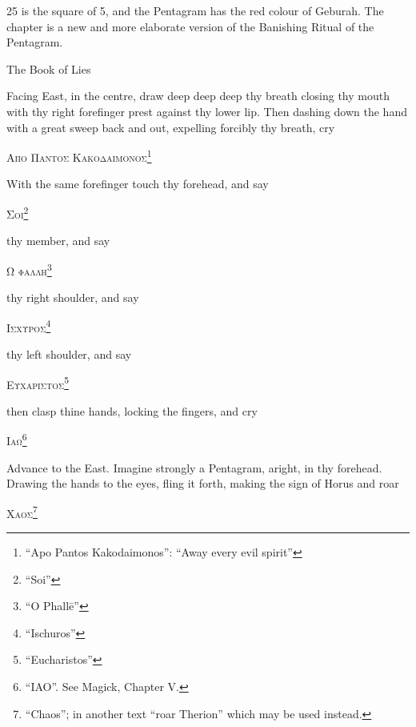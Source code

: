 
\epigraph{25 is the square of 5, and the Pentagram has the red colour of Geburah. The chapter is a new and more elaborate version of the Banishing Ritual of the Pentagram.}{The Book of Lies}


Facing East, in the centre, draw deep deep deep thy breath closing thy mouth with thy right forefinger prest against thy lower lip. Then dashing down the hand with a great sweep back and out, expelling forcibly thy breath, cry


\begin{quoting}[indentfirst=false]
\textsc{Απο Παντοσ Κακοδαιμονοσ}\footnote{\enquote{Apo Pantos Kakodaimonos}: \enquote{Away every evil spirit}}
\end{quoting}

With the same forefinger touch thy forehead, and say
\begin{quoting}[indentfirst=false]
\textsc{Σοι}\footnote{\enquote{Soi}}
\end{quoting}

thy member, and say
\begin{quoting}[indentfirst=false]
\textsc{Ω φαλλη}\footnote{\enquote{O Phall\=e}}
\end{quoting}

thy right shoulder, and say
\begin{quoting}[indentfirst=false]
\textsc{Ισχυροσ}\footnote{\enquote{Ischuros}}
\end{quoting}

thy left shoulder, and say
\begin{quoting}[indentfirst=false]
\textsc{Ευχαριστοσ}\footnote{\enquote{Eucharistos}}
\end{quoting}

then clasp thine hands, locking the fingers, and cry
\begin{quoting}[indentfirst=false]
\textsc{Ιαω}\footnote{\enquote{IAO}. See Magick, Chapter V.}
\end{quoting}

Advance to the East. Imagine strongly a Pentagram, aright, in thy forehead. Drawing the hands to the eyes, fling it forth, making the sign of Horus and roar
\begin{quoting}[indentfirst=false]
\textsc{Χαοσ}\footnote{\enquote{Chaos}; in another text \enquote{roar Therion} which may be used instead.}
\end{quoting}

